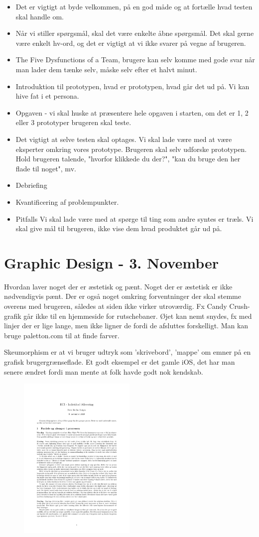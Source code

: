 \documentclass{article}
\begin{document}
\begin{itemize}
  \item Det er vigtigt at byde velkommen, på en god måde og at fortælle hvad
    testen skal handle om.
  \item Når vi stiller spørgsmål, skal det være enkelte åbne spørgsmål. Det skal
    gerne være enkelt hv-ord, og det er vigtigt at vi ikke svarer på vegne af
    brugeren.
  \item The Five Dysfunctions of a Team, brugere kan selv komme med gode svar
    når man lader dem tænke selv, måske selv efter et halvt minut. 
  \item Introduktion til prototypen, hvad er prototypen, hvad går det ud på. Vi
    kan hive fat i et persona. 
  \item Opgaven - vi skal huske at præsentere hele opgaven i starten, om det er
    1, 2 eller 3 prototyper brugeren skal teste.
  \item Det vigtigt at selve testen skal optages. Vi skal lade være med at være
    eksperter omkring vores prototype. Brugeren skal selv udforske prototypen.
    Hold brugeren talende, "hvorfor klikkede du der?", "kan du bruge den her
    flade til noget", mv.
  \item Debriefing
  \item Kvantificering af problempunkter. 
  \item Pitfalls
    \subitem Vi skal lade være med at spørge til ting som andre syntes er træls.
    Vi skal give mål til brugeren, ikke vise dem hvad produktet går ud på.
\end{itemize}

\newpage
\section{Graphic Design - 3. November} 
Hvordan laver noget der er æstetisk og pænt. Noget der er æstetisk er ikke
nødvendigvis pænt. Der er også noget omkring forventninger der skal stemme
overens med brugeren, således at siden ikke virker utroværdig. Fx Candy
Crush-grafik går ikke til en hjemmeside for rutschebaner.
Øjet kan nemt snydes, fx med linjer der er lige lange, men ikke ligner de fordi
de afsluttes forskelligt. Man kan bruge paletton.com til at finde farver. 

Skeumorphism er at vi bruger udtryk som 'skrivebord', 'mappe' om emner på en
grafisk brugergrænseflade. Et godt eksempel er det gamle iOS, det har man senere
ændret fordi man mente at folk havde godt nok kendskab.

\begin{figure}
  \centering
  \includegraphics[width=0.5\textwidth]{./assignment/assignment.pdf}
\end{figure}
\end{document}
